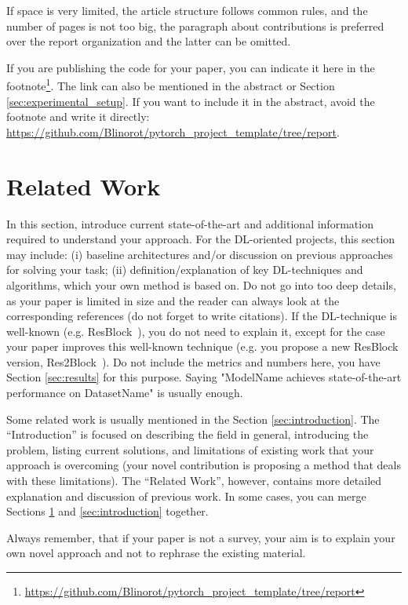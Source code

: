 \documentclass[10pt,conference,compsocconf]{IEEEtran}
\begin{document}
If space is very limited, the article structure follows common rules, and the number of pages is not too big, the paragraph about contributions is preferred over the report organization and the latter can be omitted.

If you are publishing the code for your paper, you can indicate it here in the footnote\footnote{\url{https://github.com/Blinorot/pytorch_project_template/tree/report}}. The link can also be mentioned in the abstract or Section \ref{sec:experimental_setup}. If you want to include it in the abstract, avoid the footnote and write it directly: \url{https://github.com/Blinorot/pytorch_project_template/tree/report}.

\section{Related Work}\label{sec:related_work}
In this section, introduce current state-of-the-art and additional information required to understand your approach. For the DL-oriented projects, this section may include: (i) baseline architectures and/or discussion on previous approaches for solving your task; (ii) definition/explanation of key DL-techniques and algorithms, which your own method is based on. Do not go into too deep details, as your paper is limited in size and the reader can always look at the corresponding references (do not forget to write citations). If the DL-technique is well-known (e.g. ResBlock~\cite{he2016deep}), you do not need to explain it, except for the case your paper improves this well-known technique (e.g. you propose a new ResBlock version, Res2Block~\cite{gao2019res2net}). Do not include the metrics and numbers here, you have Section \ref{sec:results} for this purpose. Saying "ModelName achieves state-of-the-art performance on DatasetName" is usually enough.

Some related work is usually mentioned in the Section \ref{sec:introduction}. The ``Introduction'' is focused on describing the field in general, introducing the problem, listing current solutions, and limitations of existing work that your approach is overcoming (your novel contribution is proposing a method that deals with these limitations). The ``Related Work'', however, contains more detailed explanation and discussion of previous work. In some cases, you can merge Sections \ref{sec:related_work} and \ref{sec:introduction} together.

Always remember, that if your paper is not a survey, your aim is to explain your own novel approach and not to rephrase the existing material. 
\end{document}

